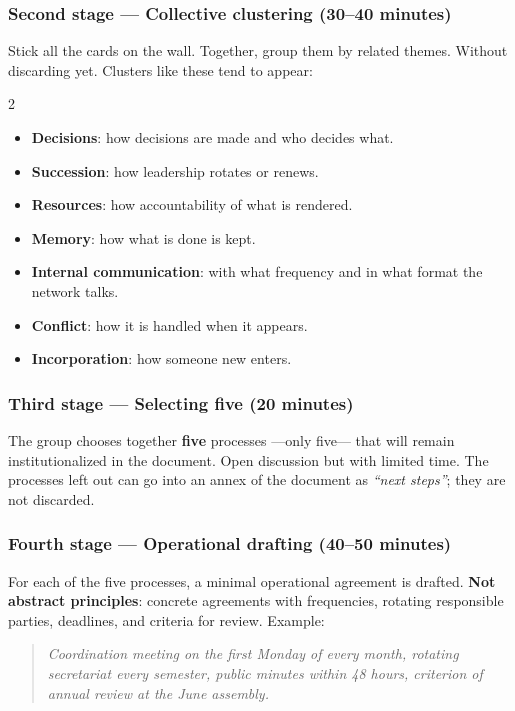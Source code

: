 \documentclass[11pt, a4paper]{article}
\begin{document}
\begin{actividad}
\subsubsection*{Second stage --- Collective clustering (30--40 minutes)}
Stick all the cards on the wall. Together, group them by related themes. Without discarding yet. Clusters like these tend to appear:

\begin{multicols}{2}
\begin{itemize}
  \item \textbf{Decisions}: how decisions are made and who decides what.
  \item \textbf{Succession}: how leadership rotates or renews.
  \item \textbf{Resources}: how accountability of what is rendered.
  \item \textbf{Memory}: how what is done is kept.
  \item \textbf{Internal communication}: with what frequency and in what format the network talks.
  \item \textbf{Conflict}: how it is handled when it appears.
  \item \textbf{Incorporation}: how someone new enters.
\end{itemize}
\end{multicols}

\subsubsection*{Third stage --- Selecting five (20 minutes)}
The group chooses together \textbf{five} processes ---only five--- that will remain institutionalized in the document. Open discussion but with limited time. The processes left out can go into an annex of the document as \emph{``next steps''}; they are not discarded.

\subsubsection*{Fourth stage --- Operational drafting (40--50 minutes)}
For each of the five processes, a minimal operational agreement is drafted. \textbf{Not abstract principles}: concrete agreements with frequencies, rotating responsible parties, deadlines, and criteria for review. Example:

\begin{quote}
\textit{Coordination meeting on the first Monday of every month, rotating secretariat every semester, public minutes within 48 hours, criterion of annual review at the June assembly.}
\end{quote}


\end{actividad}
\end{document}

